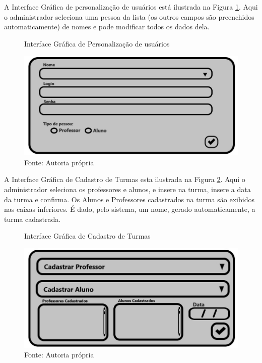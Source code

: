 \documentclass{utfpr-pg}
\begin{document}
        A Interface Gráfica de personalização de usuários está ilustrada na Figura \ref{fig:13.2}. Aqui o administrador seleciona uma pessoa da lista (os outros campos são preenchidos automaticamente) de nomes e pode modificar todos os dados dela.
        \begin{figure}[H]
            \centering
            \captionsetup{width=0.9\textwidth}
            \caption{Interface Gráfica de Personalização de usuários}
            \includegraphics[width=\linewidth]{fotos/13.2.jpg}
            \caption*{Fonte: Autoria própria}
            \label{fig:13.2}
        \end{figure}
        
        A Interface Gráfica de Cadastro de Turmas esta ilustrada na Figura \ref{fig:14}. Aqui o administrador seleciona os professores e alunos, e insere na turma, insere a data da turma e confirma. Os Alunos e Professores cadastrados na turma são exibidos nas caixas inferiores. É dado, pelo sistema, um nome, gerado automaticamente, a turma cadastrada.
        
        \begin{figure}[H]
            \centering
            \captionsetup{width=0.9\textwidth}
            \caption{Interface Gráfica de Cadastro de Turmas}
            \includegraphics[width=\linewidth]{fotos/14.jpg}
            \caption*{Fonte: Autoria própria}
            \label{fig:14}
        \end{figure}
        
\end{document}
